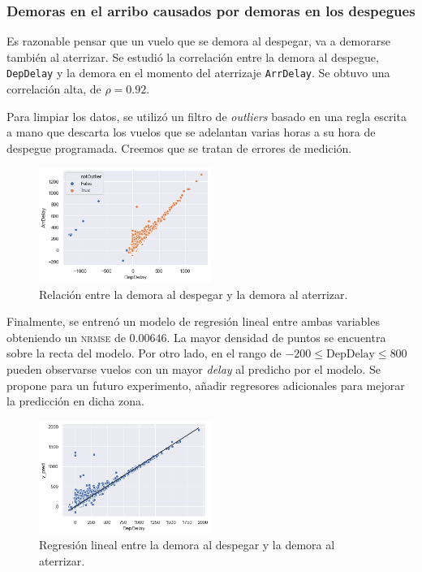 \subsubsection{Demoras en el arribo causados por demoras en los despegues}%
\label{sub:dep_arr_delay}

Es razonable pensar que un vuelo que se demora al despegar, va a demorarse
también al aterrizar. Se estudió la correlación entre la demora al despegue,
\texttt{DepDelay} y la demora en el momento del aterrizaje \texttt{ArrDelay}.
Se obtuvo una correlación alta, de $\rho=0.92$.

Para limpiar los datos, se utilizó un filtro de \textit{outliers} basado en una
regla escrita a mano que descarta los vuelos que se adelantan varias horas a su
hora de despegue programada. Creemos que se tratan de errores de medición.

\begin{figure}[h]
\centering
\includegraphics[width=0.5\textwidth]{img/dep_arr_delay_outliers_a_mano.png}
\caption{Relación entre la demora al despegar y la demora al aterrizar.}
\end{figure}

Finalmente, se entrenó un modelo de regresión lineal entre ambas variables obteniendo un \textsc{nrmse} de $0.00646$.
La mayor densidad de puntos se encuentra sobre la
recta del modelo.
Por otro lado, en el rango de $-200 \leq \mathrm{DepDelay} \leq 800$ pueden observarse vuelos con un mayor
\textit{delay} al predicho por el modelo. Se propone para un futuro
experimento, añadir regresores adicionales para mejorar la predicción en dicha zona.

\begin{figure}[h]
\centering
\includegraphics[width=0.5\textwidth]{img/dep_arr_delay_regplot.png}
\caption{Regresión lineal entre la demora al despegar y la demora al aterrizar.}
\end{figure}

